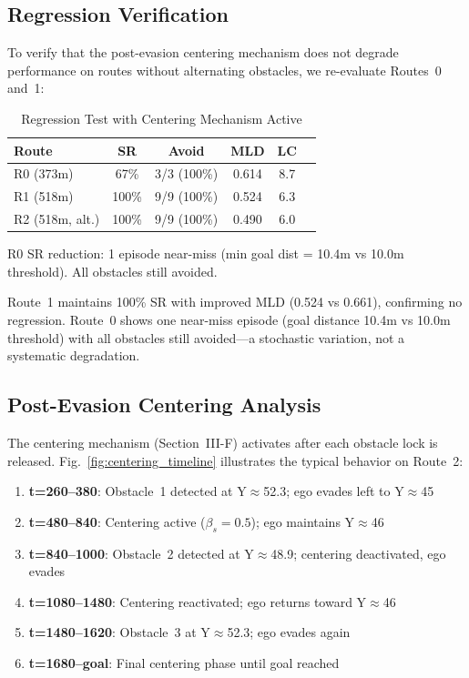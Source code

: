 \documentclass[conference]{IEEEtran}
\begin{document}
\subsection{Regression Verification}

To verify that the post-evasion centering mechanism does not degrade performance on routes without alternating obstacles, we re-evaluate Routes~0 and~1:

\begin{table}[t]
\centering
\caption{Regression Test with Centering Mechanism Active}
\label{tab:regression}
\begin{tabular}{lccccc}
\toprule
\textbf{Route} & \textbf{SR} & \textbf{Avoid} & \textbf{MLD} & \textbf{LC} \\
\midrule
R0 (373m) & 67\% & 3/3 (100\%) & 0.614 & 8.7 \\
R1 (518m) & 100\% & 9/9 (100\%) & 0.524 & 6.3 \\
R2 (518m, alt.) & 100\% & 9/9 (100\%) & 0.490 & 6.0 \\
\bottomrule
\end{tabular}
\vspace{1mm}
\small{R0 SR reduction: 1 episode near-miss (min goal dist = 10.4m vs 10.0m threshold). All obstacles still avoided.}
\end{table}

Route~1 maintains 100\% SR with improved MLD (0.524 vs 0.661), confirming no regression. Route~0 shows one near-miss episode (goal distance 10.4m vs 10.0m threshold) with all obstacles still avoided---a stochastic variation, not a systematic degradation.

\subsection{Post-Evasion Centering Analysis}

The centering mechanism (Section~III-F) activates after each obstacle lock is released. Fig.~\ref{fig:centering_timeline} illustrates the typical behavior on Route~2:

\begin{enumerate}
    \item \textbf{t=260--380}: Obstacle~1 detected at Y$\approx$52.3; ego evades left to Y$\approx$45
    \item \textbf{t=480--840}: Centering active ($\beta_s{=}0.5$); ego maintains Y$\approx$46
    \item \textbf{t=840--1000}: Obstacle~2 detected at Y$\approx$48.9; centering deactivated, ego evades
    \item \textbf{t=1080--1480}: Centering reactivated; ego returns toward Y$\approx$46
    \item \textbf{t=1480--1620}: Obstacle~3 at Y$\approx$52.3; ego evades again
    \item \textbf{t=1680--goal}: Final centering phase until goal reached
\end{enumerate}
\end{document}

